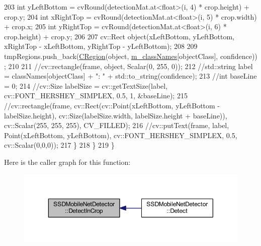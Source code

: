 \begin{DoxyCode}
203             \textcolor{keywordtype}{int} yLeftBottom = cvRound(detectionMat.at<\textcolor{keywordtype}{float}>(i, 4) * crop.height) + crop.y;
204             \textcolor{keywordtype}{int} xRightTop = cvRound(detectionMat.at<\textcolor{keywordtype}{float}>(i, 5) * crop.width) + crop.x;
205             \textcolor{keywordtype}{int} yRightTop = cvRound(detectionMat.at<\textcolor{keywordtype}{float}>(i, 6) * crop.height) + crop.y;
206 
207             cv::Rect object(xLeftBottom, yLeftBottom, xRightTop - xLeftBottom, yRightTop - yLeftBottom);
208 
209             tmpRegions.push\_back(\mbox{\hyperlink{class_c_region}{CRegion}}(\textcolor{keywordtype}{object}, \mbox{\hyperlink{class_s_s_d_mobile_net_detector_a717ffc431ea4fd25cbc6cb1172cbd7e6}{m\_classNames}}[objectClass], confidence))
      ;
210 
211             \textcolor{comment}{//cv::rectangle(frame, object, Scalar(0, 255, 0));}
212             \textcolor{comment}{//std::string label = classNames[objectClass] + ": " + std::to\_string(confidence);}
213             \textcolor{comment}{//int baseLine = 0;}
214             \textcolor{comment}{//cv::Size labelSize = cv::getTextSize(label, cv::FONT\_HERSHEY\_SIMPLEX, 0.5, 1, &baseLine);}
215             \textcolor{comment}{//cv::rectangle(frame, cv::Rect(cv::Point(xLeftBottom, yLeftBottom - labelSize.height),
       cv::Size(labelSize.width, labelSize.height + baseLine)), cv::Scalar(255, 255, 255), CV\_FILLED);}
216             \textcolor{comment}{//cv::putText(frame, label, Point(xLeftBottom, yLeftBottom), cv::FONT\_HERSHEY\_SIMPLEX, 0.5,
       cv::Scalar(0,0,0));}
217         \}
218     \}
219 \}
\end{DoxyCode}
Here is the caller graph for this function\+:\nopagebreak
\begin{figure}[H]
\begin{center}
\leavevmode
\includegraphics[width=350pt]{class_s_s_d_mobile_net_detector_a9c0fe7a122d0b229d84965f472cc6c38_icgraph}
\end{center}
\end{figure}
\mbox{\label{class_base_detector_a52ac4b2feed15a47de84a69eb45c233f}} 
